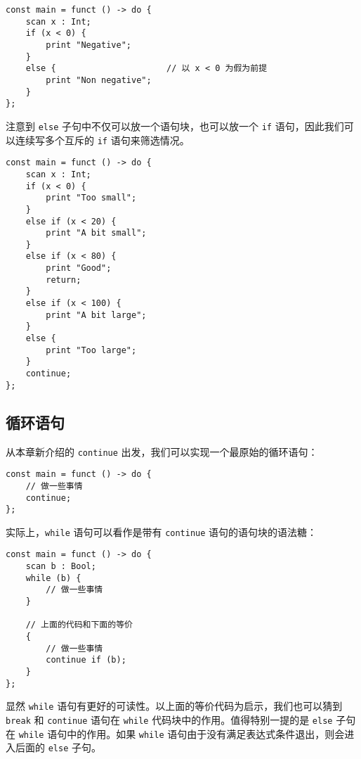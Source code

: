 \begin{minipage}[c]{0.95\textwidth}
\vspace{1.0em}
\begin{lstlisting}
const main = funct () -> do {
    scan x : Int;
    if (x < 0) {
        print "Negative";
    }
    else {                      // 以 x < 0 为假为前提
        print "Non negative";
    }
};
\end{lstlisting}
\end{minipage}

注意到 \lstinline!else! 子句中不仅可以放一个语句块，也可以放一个 \lstinline!if! 语句，因此我们可以连续写多个互斥的 \lstinline!if! 语句来筛选情况。

\begin{lstlisting}
const main = funct () -> do {
    scan x : Int;
    if (x < 0) {
        print "Too small";
    }
    else if (x < 20) {
        print "A bit small";
    }
    else if (x < 80) {
        print "Good";
        return;
    }
    else if (x < 100) {
        print "A bit large";
    }
    else {
        print "Too large";
    }
    continue;
};
\end{lstlisting}

\subsection{循环语句}

从本章新介绍的 \lstinline!continue! 出发，我们可以实现一个最原始的循环语句：

\begin{lstlisting}
const main = funct () -> do {
    // 做一些事情
    continue;
};
\end{lstlisting}

实际上，\lstinline!while! 语句可以看作是带有 \lstinline!continue! 语句的语句块的语法糖：

\begin{lstlisting}
const main = funct () -> do {
    scan b : Bool;
    while (b) {
        // 做一些事情
    }

    // 上面的代码和下面的等价
    {
        // 做一些事情
        continue if (b);
    }
};
\end{lstlisting}

显然 \lstinline!while! 语句有更好的可读性。以上面的等价代码为启示，我们也可以猜到 \lstinline!break! 和 \lstinline!continue! 语句在 \lstinline!while! 代码块中的作用。值得特别一提的是 \lstinline!else! 子句在 \lstinline!while! 语句中的作用。如果 \lstinline!while! 语句由于没有满足表达式条件退出，则会进入后面的 \lstinline!else! 子句。

